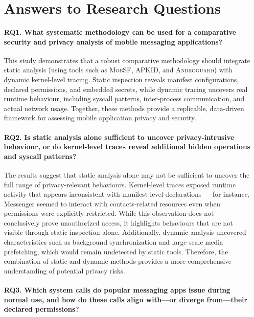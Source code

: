 \documentclass[a4paper,12pt]{report}
\begin{document}
\section{Answers to Research Questions}

\paragraph{\textbf{RQ1.} What systematic methodology can be used for a comparative security and privacy analysis of mobile messaging applications?}

This study demonstrates that a robust comparative methodology should integrate static analysis (using tools such as \textsc{MobSF}, \textsc{APKID}, and \textsc{Androguard}) with dynamic kernel-level tracing. Static inspection reveals manifest configurations, declared permissions, and embedded secrets, while dynamic tracing uncovers real runtime behaviour, including syscall patterns, inter-process communication, and actual network usage. Together, these methods provide a replicable, data-driven framework for assessing mobile application privacy and security.

\paragraph{\textbf{RQ2.} Is static analysis alone sufficient to uncover privacy-intrusive behaviour, or do kernel-level traces reveal additional hidden operations and syscall patterns?}

The results suggest that static analysis alone may not be sufficient to uncover the full range of privacy-relevant behaviours. Kernel-level traces exposed runtime activity that appears inconsistent with manifest-level declarations — for instance, Messenger seemed to interact with contacts-related resources even when permissions were explicitly restricted. While this observation does not conclusively prove unauthorized access, it highlights behaviours that are not visible through static inspection alone. Additionally, dynamic analysis uncovered characteristics such as background synchronization and large-scale media prefetching, which would remain undetected by static tools. Therefore, the combination of static and dynamic methods provides a more comprehensive understanding of potential privacy risks.

\paragraph{\textbf{RQ3.} Which system calls do popular messaging apps issue during normal use, and how do these calls align with—or diverge from—their declared permissions?}
\end{document}
